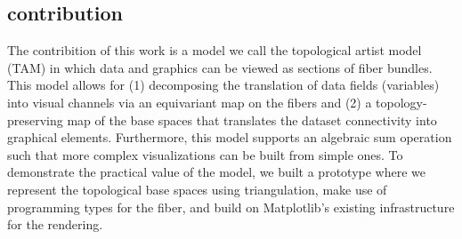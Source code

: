 \documentclass[../main.tex]{subfiles}
\begin{document}
\subsection{contribution}
The contribition of this work is a model we call the topological artist model (TAM) in which data and graphics can be viewed as sections of fiber bundles. This model allows for (1) decomposing the translation of data fields (variables) into visual channels via an equivariant map on the fibers and (2) a topology-preserving map of the base spaces that translates the dataset connectivity into graphical elements. Furthermore, this model supports an algebraic sum operation such that more complex visualizations can be built from simple ones. To demonstrate the practical value of the model, we built a prototype where we represent the topological base spaces using triangulation, make use of programming types for the fiber, and build on Matplotlib's existing infrastructure for the rendering. 
\end{document}
